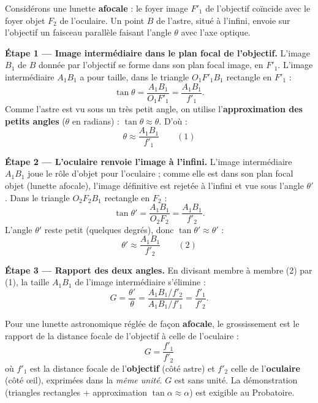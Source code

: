 \documentclass[11pt]{article}
\begin{document}
\begin{experience}[Démonstration guidée : $G = f'_1/f'_2$]
Considérons une lunette \textbf{afocale} : le foyer image $F'_1$ de l'objectif coïncide avec le foyer objet $F_2$ de l'oculaire. Un point $B$ de l'astre, situé à l'infini, envoie sur l'objectif un faisceau parallèle faisant l'angle $\theta$ avec l'axe optique.

\textbf{Étape 1 — Image intermédiaire dans le plan focal de l'objectif.} L'image $B_1$ de $B$ donnée par l'objectif se forme dans son plan focal image, en $F'_1$. L'image intermédiaire $A_1B_1$ a pour taille, dans le triangle $O_1F'_1B_1$ rectangle en $F'_1$ :
\[
\tan\theta = \dfrac{A_1B_1}{O_1F'_1} = \dfrac{A_1B_1}{f'_1}.
\]
Comme l'astre est vu sous un très petit angle, on utilise l'\textbf{approximation des petits angles} ($\theta$ en radians) : $\tan\theta \approx \theta$. D'où :
\[
\theta \approx \dfrac{A_1B_1}{f'_1} \qquad (1)
\]

\textbf{Étape 2 — L'oculaire renvoie l'image à l'infini.} L'image intermédiaire $A_1B_1$ joue le rôle d'objet pour l'oculaire ; comme elle est dans son plan focal objet (lunette afocale), l'image définitive est rejetée à l'infini et vue sous l'angle $\theta'$. Dans le triangle $O_2F_2B_1$ rectangle en $F_2$ :
\[
\tan\theta' = \dfrac{A_1B_1}{O_2F_2} = \dfrac{A_1B_1}{f'_2}.
\]
L'angle $\theta'$ reste petit (quelques degrés), donc $\tan\theta' \approx \theta'$ :
\[
\theta' \approx \dfrac{A_1B_1}{f'_2} \qquad (2)
\]

\textbf{Étape 3 — Rapport des deux angles.} En divisant membre à membre (2) par (1), la taille $A_1B_1$ de l'image intermédiaire s'élimine :
\[
G = \dfrac{\theta'}{\theta} = \dfrac{A_1B_1/f'_2}{A_1B_1/f'_1} = \dfrac{f'_1}{f'_2}.
\]
\end{experience}

\begin{propriete}
Pour une lunette astronomique réglée de façon \textbf{afocale}, le grossissement est le rapport de la distance focale de l'objectif à celle de l'oculaire :
\[
\boxed{G = \dfrac{f'_1}{f'_2}}
\]
où $f'_1$ est la distance focale de l'\textbf{objectif} (côté astre) et $f'_2$ celle de l'\textbf{oculaire} (côté œil), exprimées dans la \emph{même unité}. $G$ est sans unité. La démonstration (triangles rectangles + approximation $\tan\alpha \approx \alpha$) est exigible au Probatoire.
\end{propriete}
\end{document}
